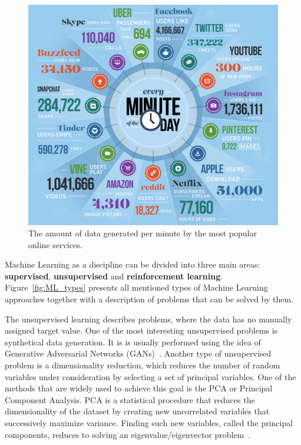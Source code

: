 \begin{figure}[h]
\centering
\includegraphics[scale=0.8]{figures/big_data.jpg}
\caption{The amount of data generated per minute by the most popular online services.
\label{fig:big_data}}
\end{figure}

Machine Learning as a discipline can be divided into three main areas: \textbf{supervised}, \textbf{unsupervised} and \textbf{reinforcement learning}. Figure~\ref{fig:ML_types} presents all mentioned types of Machine Learning approaches together with a description of problems that can be solved by them. 

The unsupervised learning describes problems, where the data has no manually assigned target value. One of the most interesting unsupervised problems is synthetical data generation. It is is usually performed using the idea of Generative Adversarial Networks (GANs)~\cite{GAN}. Another type of unsupervised problem is a dimensionality reduction, which reduces the number of random variables under consideration by selecting a set of principal variables. 
One of the methods that are widely used to achieve this goal is the PCA or Principal Component Analysis. 
PCA is a statistical procedure that reduces the dimensionality of the dataset by creating new uncorrelated variables that successively maximize variance. Finding such new variables, called the principal components, reduces to solving an eigenvalue/eigenvector problem~\cite{PCA}. 

